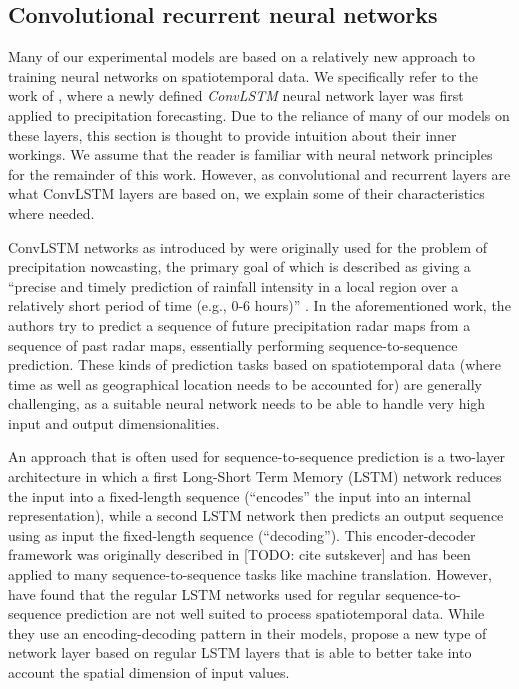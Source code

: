 \subsection{Convolutional recurrent neural networks}
\label{sst:neural_networks}
Many of our experimental models are based on a relatively new approach to training neural networks on spatiotemporal data. We specifically refer to the work of \citet{Shi.2015}, where a newly defined \textit{ConvLSTM} neural network layer was first applied to precipitation forecasting. Due to the reliance of many of our models on these layers, this section is thought to provide intuition about their inner workings. We assume that the reader is familiar with neural network principles for the remainder of this work. However, as convolutional and recurrent layers are what ConvLSTM layers are based on, we explain some of their characteristics where needed.

ConvLSTM networks as introduced by \citet{Shi.2015} were originally used for the problem of precipitation nowcasting, the primary goal of which is described as giving a ``precise and timely prediction of rainfall intensity in a local region over a relatively short period of time (e.g., 0-6 hours)'' \citep{Shi.2015}. In the aforementioned work, the authors try to predict a sequence of future precipitation radar maps from a sequence of past radar maps, essentially performing sequence-to-sequence prediction. These kinds of prediction tasks based on spatiotemporal data (where time as well as geographical location needs to be accounted for) are generally challenging, as a suitable neural network needs to be able to handle very high input and output dimensionalities.

An approach that is often used for sequence-to-sequence prediction is a two-layer architecture in which a first Long-Short Term Memory (LSTM) network reduces the input into a fixed-length sequence (``encodes'' the input into an internal representation), while a second LSTM network then predicts an output sequence using as input the fixed-length sequence (``decoding''). This encoder-decoder framework was originally described in [TODO: cite sutskever] and has been applied to many sequence-to-sequence tasks like machine translation. However, \citet{Shi.2015} have found that the regular LSTM networks used for regular sequence-to-sequence prediction are not well suited to process spatiotemporal data. While they use an encoding-decoding pattern in their models, \citet{Shi.2015} propose a new type of network layer based on regular LSTM layers that is able to better take into account the spatial dimension of input values.

